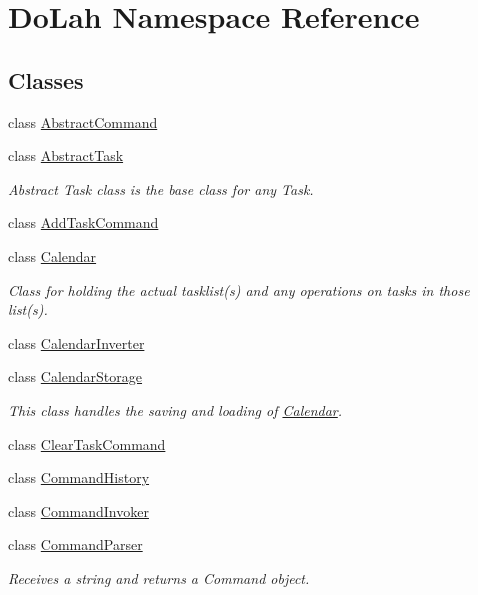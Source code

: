 \hypertarget{namespace_do_lah}{}\section{Do\+Lah Namespace Reference}
\label{namespace_do_lah}
\subsection*{Classes}
\begin{DoxyCompactItemize}
\item 
class \hyperlink{class_do_lah_1_1_abstract_command}{Abstract\+Command}
\item 
class \hyperlink{class_do_lah_1_1_abstract_task}{Abstract\+Task}
\begin{DoxyCompactList}\small\item\em Abstract Task class is the base class for any Task. \end{DoxyCompactList}\item 
class \hyperlink{class_do_lah_1_1_add_task_command}{Add\+Task\+Command}
\item 
class \hyperlink{class_do_lah_1_1_calendar}{Calendar}
\begin{DoxyCompactList}\small\item\em Class for holding the actual tasklist(s) and any operations on tasks in those list(s). \end{DoxyCompactList}\item 
class \hyperlink{class_do_lah_1_1_calendar_inverter}{Calendar\+Inverter}
\item 
class \hyperlink{class_do_lah_1_1_calendar_storage}{Calendar\+Storage}
\begin{DoxyCompactList}\small\item\em This class handles the saving and loading of \hyperlink{class_do_lah_1_1_calendar}{Calendar}. \end{DoxyCompactList}\item 
class \hyperlink{class_do_lah_1_1_clear_task_command}{Clear\+Task\+Command}
\item 
class \hyperlink{class_do_lah_1_1_command_history}{Command\+History}
\item 
class \hyperlink{class_do_lah_1_1_command_invoker}{Command\+Invoker}
\item 
class \hyperlink{class_do_lah_1_1_command_parser}{Command\+Parser}
\begin{DoxyCompactList}\small\item\em Receives a string and returns a Command object. \end{DoxyCompactList}\item 

\end{DoxyCompactItemize}
